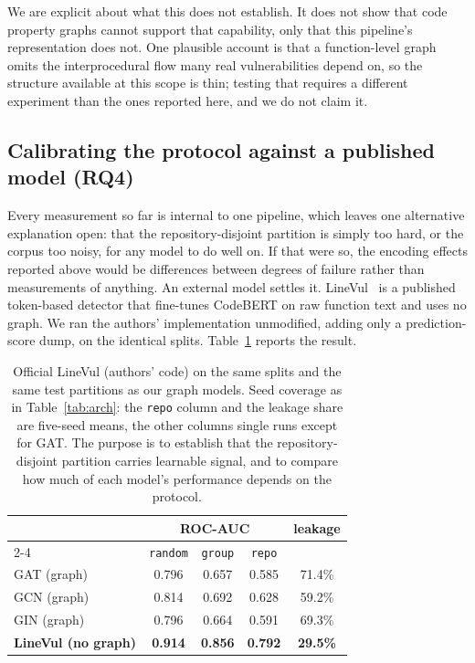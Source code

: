 We are explicit about what this does not establish. It does not show that code
property graphs cannot support that capability, only that this pipeline's
representation does not. One plausible account is that a function-level graph
omits the interprocedural flow many real vulnerabilities depend on, so the
structure available at this scope is thin; testing that requires a different
experiment than the ones reported here, and we do not claim it.

\subsection{Calibrating the protocol against a published model (\textbf{RQ4})}
\label{sec:linevul}

Every measurement so far is internal to one pipeline, which leaves one
alternative explanation open: that the repository-disjoint partition is simply
too hard, or the corpus too noisy, for any model to do well on. If that were so,
the encoding effects reported above would be differences between degrees of
failure rather than measurements of anything. An external model settles it.
LineVul~\citep{fu2022linevul} is a published token-based detector that fine-tunes
CodeBERT on raw function text and uses no graph. We ran the authors'
implementation unmodified, adding only a prediction-score dump, on the identical
splits. Table~\ref{tab:linevul} reports the result.

\begin{table}[h]
\centering
\caption{Official LineVul (authors' code) on the same splits and the same test
partitions as our graph models. Seed coverage as in Table~\ref{tab:arch}: the
\texttt{repo} column and the leakage share are five-seed means, the other
columns single runs except for GAT. The purpose is to establish that the
repository-disjoint partition carries learnable signal, and to compare how much
of each model's performance depends on the protocol.}
\label{tab:linevul}
\begin{tabular}{lcccc}
\toprule
& \multicolumn{3}{c}{\textbf{ROC-AUC}} & \textbf{leakage} \\
\cmidrule(lr){2-4}
& \texttt{random} & \texttt{group} & \texttt{repo} & \\
\midrule
GAT (graph)          & 0.796 & 0.657 & 0.585 & 71.4\% \\
GCN (graph)          & 0.814 & 0.692 & 0.628 & 59.2\% \\
GIN (graph)          & 0.796 & 0.664 & 0.591 & 69.3\% \\
\textbf{LineVul (no graph)} & \textbf{0.914} & \textbf{0.856} & \textbf{0.792} & \textbf{29.5\%} \\
\bottomrule
\end{tabular}
\end{table}

